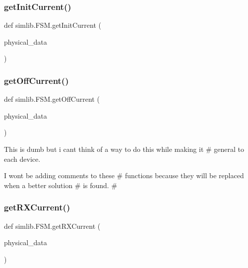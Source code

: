 \mbox{\label{namespacesimlib_1_1_f_s_m_a585836de7988c4c8a00953ff69743ebb}} 
\subsubsection{\texorpdfstring{get\+Init\+Current()}{getInitCurrent()}}
{\footnotesize\ttfamily def simlib.\+F\+S\+M.\+get\+Init\+Current (\begin{DoxyParamCaption}\item[{}]{physical\+\_\+data }\end{DoxyParamCaption})}

\mbox{\label{namespacesimlib_1_1_f_s_m_ad5212728fbbcd07317b41dcadd83abf5}} 
\subsubsection{\texorpdfstring{get\+Off\+Current()}{getOffCurrent()}}
{\footnotesize\ttfamily def simlib.\+F\+S\+M.\+get\+Off\+Current (\begin{DoxyParamCaption}\item[{}]{physical\+\_\+data }\end{DoxyParamCaption})}



This is dumb but i cant think of a way to do this while making it \# general to each device. 

I won\textquotesingle{}t be adding comments to these \# functions because they will be replaced when a better solution \# is found. \# \mbox{\label{namespacesimlib_1_1_f_s_m_a63cebb729f3311d63c6d9c4604dd7528}} 
\subsubsection{\texorpdfstring{get\+R\+X\+Current()}{getRXCurrent()}}
{\footnotesize\ttfamily def simlib.\+F\+S\+M.\+get\+R\+X\+Current (\begin{DoxyParamCaption}\item[{}]{physical\+\_\+data }\end{DoxyParamCaption})}

